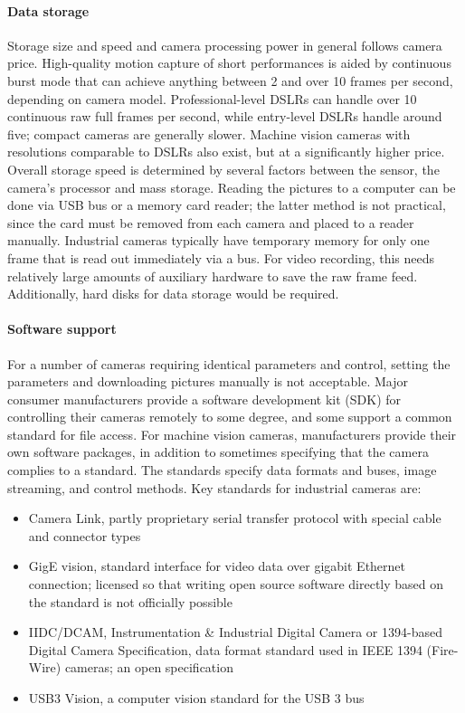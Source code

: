 \paragraph{Data storage}
Storage size and speed and camera processing power in general follows camera price.
High-quality motion capture of short performances is aided by continuous burst mode that can achieve anything between 2 and over 10 frames per second, depending on camera model.
Professional-level DSLRs can handle over 10 continuous raw full frames per second, while entry-level DSLRs handle around five;
compact cameras are generally slower.
Machine vision cameras with resolutions comparable to DSLRs also exist, but at a significantly higher price.
Overall storage speed is determined by several factors between the sensor, the camera's processor and mass storage.
Reading the pictures to a computer can be done via USB bus or a memory card reader; the latter method is not practical, since the card must be removed from each camera and placed to a reader manually.
Industrial cameras typically have temporary memory for only one frame that is read out immediately via a bus.
For video recording, this needs relatively large amounts of auxiliary hardware to save the raw frame feed.
Additionally, hard disks for data storage would be required.


\paragraph{Software support}
For a number of cameras requiring identical parameters and control, setting the parameters and downloading pictures manually is not acceptable.
Major consumer manufacturers provide a software development kit (SDK) for controlling their cameras remotely to some degree, and some support a common standard for file access.
For machine vision cameras, manufacturers provide their own software packages, in addition to sometimes specifying that the camera complies to a standard.
The standards specify data formats and buses, image streaming, and control methods.
Key standards for industrial cameras are: \cite{hornberg2007handbook,ni2013choosing}

\begin{itemize}
	\item Camera Link, partly proprietary serial transfer protocol with special cable and connector types %
	\item GigE vision, standard interface for video data over gigabit Ethernet connection; licensed so that writing open source software directly based on the standard is not officially possible
	\item IIDC/DCAM, Instrumentation \& Industrial Digital Camera or 1394-based Digital Camera Specification, data format standard used in IEEE 1394 (Fire-Wire) cameras; an open specification
	\item USB3 Vision, a computer vision standard for the USB 3 bus
\end{itemize}

